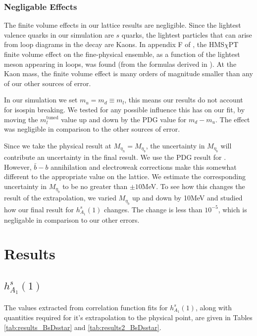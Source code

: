 \subsubsection{Negligable Effects}

The finite volume effects in our lattice results are negligible. Since the lightest valence quarks in our simulation are $s$ quarks, the lightest particles that can arise from loop diagrams in the decay are Kaons. In appendix F of \cite{Harrison:2017fmw}, the HMS$\chi$PT finite volume effect on the fine-physical ensemble, as a function of the lightest meson appearing in loops, was found (from the formulas derived in \cite{Laiho:2005ue}). At the Kaon mass, the finite volume effect is many orders of magnitude smaller than any of our other sources of error. 

In our simulation we set $m_u=m_d\equiv m_l$, this means our results do not account for isospin breaking. We tested for any possible influence this has on our fit, by moving the $m_l^{\text{tuned}}$ value up and down by the PDG value for $m_d-m_u$. The effect was negligible in comparison to the other sources of error.

Since we take the physical result at $M_{\eta_h}=M_{\eta_b}$, the uncertainty in $M_{\eta_b}$ will contribute an uncertainty in the final result. We use the PDG result for \cite{PhysRevD.98.030001}. However, $\bar{b}-b$ annihilation and electroweak corrections make this somewhat different to the appropriate value on the lattice. We estimate the corresponding uncertainty in $M_{\eta_b}$ to be no greater than $\pm10$MeV. To see how this changes the result of the extrapolation, we varied $M_{\eta_b}$ up and down by 10MeV and studied how our final result for $h_{A_1}^s(1)$ changes. The change is less than $10^{-5}$, which is negligable in comparison to our other errors.

\section{Results}
\label{sec:results_BsDsstar}

\subsection{$h^s_{A_1}(1)$}

The values extracted from correlation function fits for $h^s_{A_1}(1)$, along with quantities required for it's extrapolation to the physical point, are given in Tables \ref{tab:results_BsDsstar} and \ref{tab:results2_BsDsstar}.

